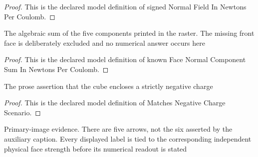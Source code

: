 \begin{proof}
  This is the declared model definition of signed Normal Field In Newtons Per Coulomb.
\end{proof}
\begin{definition}
  \label{def:physics:phyx-mini-0840:phyxminiproblems-problemphyxmini0840-knownfacenormalcomponentsuminnewtonspercoulomb}
  The algebraic sum of the five components printed in the raster. The missing front face is deliberately excluded and no numerical answer occurs here
\end{definition}
\begin{proof}
  This is the declared model definition of known Face Normal Component Sum In Newtons Per Coulomb.
\end{proof}
\begin{definition}
  \label{def:physics:phyx-mini-0840:phyxminiproblems-problemphyxmini0840-matchesnegativechargescenario}
  The prose assertion that the cube encloses a strictly negative charge
\end{definition}
\begin{proof}
  This is the declared model definition of Matches Negative Charge Scenario.
\end{proof}
\begin{definition}
  \label{def:physics:phyx-mini-0840:phyxminiproblems-problemphyxmini0840-matchesprimarycubefigure}
  Primary-image evidence. There are five arrows, not the six asserted by the auxiliary caption. Every displayed label is tied to the corresponding independent physical face strength before its numerical readout is stated
\end{definition}
